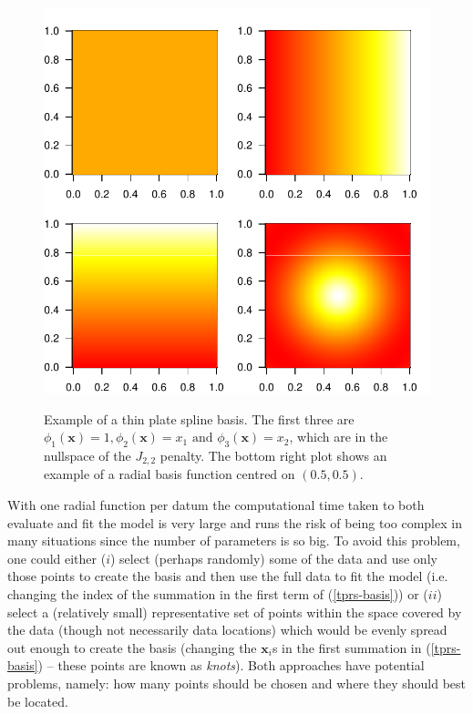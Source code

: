 \begin{figure}[p]
\centering
\includegraphics[width=\textwidth]{intro/figs/tprsex.pdf}\\
\caption{Example of a thin plate spline basis. The first three are $\phi_1(\mathbf{x})=1, \phi_2(\mathbf{x})=x_1 \text{ and } \phi_3(\mathbf{x})=x_2$, which are in the nullspace of the $J_{2,2}$ penalty. The bottom right plot shows an example of a radial basis function centred on $(0.5,0.5)$.}
\label{tprs-basis-fig}
\end{figure}

With one radial function per datum the computational time taken to both evaluate and fit the model is very large and runs the risk of being too complex in many situations since the number of parameters is so big. To avoid this problem, one could either ($i$) select (perhaps randomly) some of the data and use only those points to create the basis and then use the full data to fit the model (i.e. changing the index of the summation in the first term of (\ref{tprs-basis})) or ($ii$) select a (relatively small) representative set of points within the space covered by the data (though not necessarily data locations) which would be evenly spread out enough to create the basis (changing the $\mathbf{x}_i$s in the first summation in (\ref{tprs-basis}) -- these points are known as \textit{knots}). Both approaches have potential problems, namely: how many points should be chosen and where they should best be located.

